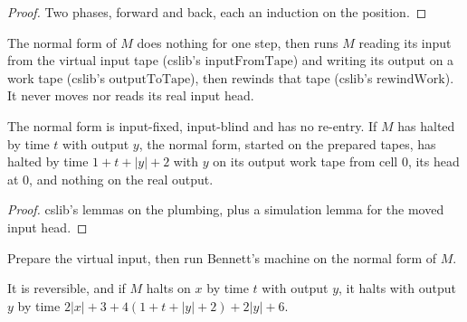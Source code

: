 \begin{proof}
  \leanok
  Two phases, forward and back, each an induction on the position.
\end{proof}

\begin{definition}
  \label{def:normTM}
  \leanok
  The normal form of $M$ does nothing for one step, then runs $M$ reading its input from the virtual
  input tape (cslib's $\mathrm{inputFromTape}$) and writing its output on a work tape (cslib's
  $\mathrm{outputToTape}$), then rewinds that tape (cslib's $\mathrm{rewindWork}$). It never moves
  nor reads its real input head.
  \own{}
\end{definition}

\begin{theorem}
  \label{thm:normTM}
  \leanok
  The normal form is input-fixed, input-blind and has no re-entry. If $M$ has halted by time $t$ with
  output $y$, the normal form, started on the prepared tapes, has halted by time $1 + t + |y| + 2$
  with $y$ on its output work tape from cell $0$, its head at $0$, and nothing on the real output.
\end{theorem}

\begin{proof}
  \leanok
  cslib's lemmas on the plumbing, plus a simulation lemma for the moved input head.
\end{proof}

\begin{definition}
  \label{def:revTM}
  \leanok
  Prepare the virtual input, then run Bennett's machine on the normal form of $M$.
  \own{}
\end{definition}

\begin{theorem}
  \label{thm:revTM}
  \leanok
  It is reversible, and if $M$ halts on $x$ by time $t$ with output $y$, it halts with output $y$ by
  time $2|x| + 3 + 4(1 + t + |y| + 2) + 2|y| + 6$.
\end{theorem}

